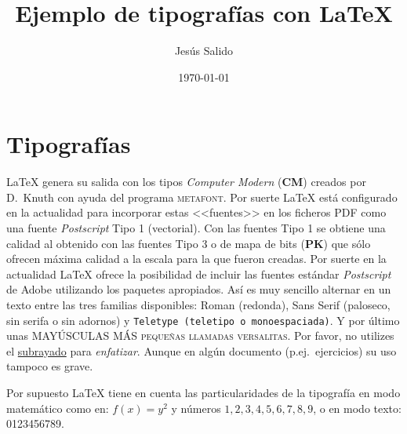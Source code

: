 \documentclass[11pt,a4paper]{article}
\title{Ejemplo de tipografías con \LaTeX}
\author{Jesús Salido}
\date{\today}
\begin{document}
\maketitle


\section{Tipografías}
\LaTeX{} genera su salida con los tipos \emph{Computer Modern} (\textbf{CM}) creados por D.~Knuth con ayuda del programa \textsc{metafont}. Por suerte \LaTeX{} está configurado en la actualidad para incorporar estas <<fuentes>> en los ficheros PDF como una fuente \emph{Postscript} Tipo 1 (vectorial). Con las fuentes Tipo 1 se obtiene una calidad al obtenido con las fuentes Tipo 3 o de mapa de bits (\textbf{PK}) que sólo ofrecen máxima calidad a la escala para la que fueron creadas. Por suerte en la actualidad \LaTeX{} ofrece la posibilidad de incluir las fuentes estándar \emph{Postscript} de \textsf{Adobe} utilizando los paquetes apropiados. Así es muy sencillo alternar en un texto entre las tres familias disponibles: Roman (redonda), \textsf{Sans Serif (paloseco, sin serifa o sin adornos)} y \texttt{Teletype (teletipo o monoespaciada)}. Y por último unas MAYÚSCULAS MÁS \textsc{pequeñas llamadas versalitas}. Por favor, no utilizes el \underline{subrayado} para \emph{enfatizar}. Aunque en algún documento (p.ej.\ ejercicios) su uso tampoco es grave.

Por supuesto \LaTeX{} tiene en cuenta las particularidades de la tipografía en modo matemático como en: $f(x)=y^2$ y números $1,2,3,4,5,6,7,8,9$, o en modo texto: 0123456789.
\end{document}
